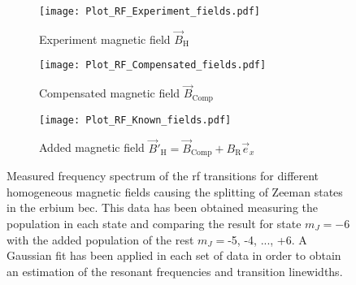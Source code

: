 \begin{figure}[!htbp]
	\centering
	\begin{subfigure}{1.\textwidth}
		\centering
		\label{fig:Plot_RF_Experiment_fields}
		\texttt{[image: Plot\_RF\_Experiment\_fields.pdf]}
		\caption{Experiment magnetic field $\vec{B}_\text{H}$}
	\end{subfigure}%
	\hfill
	\begin{subfigure}{1.\textwidth}
		\centering
		\label{fig:Plot_RF_Compensated_fields}
		\texttt{[image: Plot\_RF\_Compensated\_fields.pdf]}
		\caption{Compensated magnetic field $\vec{B}_\text{Comp}$}
	\end{subfigure}
	\hfill
	\begin{subfigure}{1.\textwidth}
		\centering
		\label{fig:Plot_RF_Known_fields}
		\texttt{[image: Plot\_RF\_Known\_fields.pdf]}
		\caption{Added magnetic field $\vec{B}'_\text{H} = \vec{B}_\text{Comp} +B_\text{R}\vec{e}_x$}
	\end{subfigure}
	\caption[Measured frequency spectrum of the \ac{rf} transitions for different homogeneous magnetic fields causing the splitting of Zeeman states in the erbium \ac{bec}]{Measured frequency spectrum of the \ac{rf} transitions for different homogeneous magnetic fields causing the splitting of Zeeman states in the erbium \ac{bec}. This data has been obtained measuring the population in each state and comparing the result for state $m_J = -6$ with the added population of the rest $m_J = $-5, -4, ..., +6. A Gaussian fit has been applied in each set of data in order to obtain an estimation of the resonant frequencies and transition linewidths.}
	\label{fig:Plot_RF_All_fields}
\end{figure}

